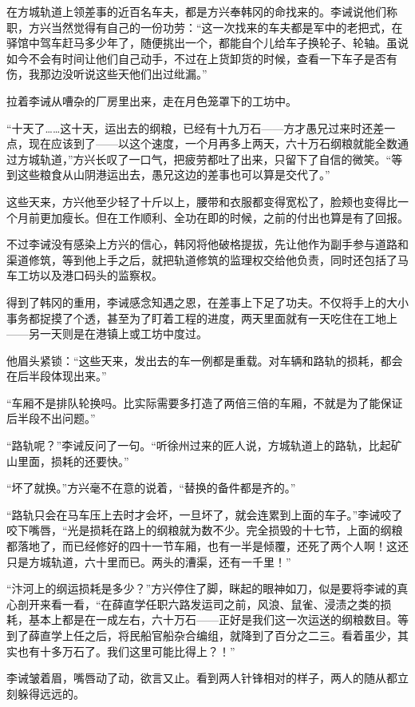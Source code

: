 在方城轨道上领差事的近百名车夫，都是方兴奉韩冈的命找来的。李诫说他们称职，方兴当然觉得有自己的一份功劳：“这一次找来的车夫都是军中的老把式，在驿馆中驾车赶马多少年了，随便挑出一个，都能自个儿给车子换轮子、轮轴。虽说如今不会有时间让他们自己动手，不过在上货卸货的时候，查看一下车子是否有伤，我那边没听说这些天他们出过纰漏。”

拉着李诫从嘈杂的厂房里出来，走在月色笼罩下的工坊中。

“十天了……这十天，运出去的纲粮，已经有十九万石——方才愚兄过来时还差一点，现在应该到了——以这个速度，一个月再多上两天，六十万石纲粮就能全数通过方城轨道，”方兴长叹了一口气，把疲劳都吐了出来，只留下了自信的微笑。“等到这些粮食从山阴港运出去，愚兄这边的差事也可以算是交代了。”

这些天来，方兴他至少轻了十斤以上，腰带和衣服都变得宽松了，脸颊也变得比一个月前更加瘦长。但在工作顺利、全功在即的时候，之前的付出也算是有了回报。

不过李诫没有感染上方兴的信心，韩冈将他破格提拔，先让他作为副手参与道路和渠道修筑，等到他上手之后，就把轨道修筑的监理权交给他负责，同时还包括了马车工坊以及港口码头的监察权。

得到了韩冈的重用，李诫感念知遇之恩，在差事上下足了功夫。不仅将手上的大小事务都捉摸了个透，甚至为了盯着工程的进度，两天里面就有一天吃住在工地上——另一天则是在港镇上或工坊中度过。

他眉头紧锁：“这些天来，发出去的车一例都是重载。对车辆和路轨的损耗，都会在后半段体现出来。”

“车厢不是排队轮换吗。比实际需要多打造了两倍三倍的车厢，不就是为了能保证后半段不出问题。”

“路轨呢？”李诫反问了一句。“听徐州过来的匠人说，方城轨道上的路轨，比起矿山里面，损耗的还要快。”

“坏了就换。”方兴毫不在意的说着，“替换的备件都是齐的。”

“路轨只会在马车压上去时才会坏，一旦坏了，就会连累到上面的车子。”李诫咬了咬下嘴唇，“光是损耗在路上的纲粮就为数不少。完全损毁的十七节，上面的纲粮都落地了，而已经修好的四十一节车厢，也有一半是倾覆，还死了两个人啊！这还只是方城轨道，六十里而已。两头的漕渠，还有一千里！”

“汴河上的纲运损耗是多少？”方兴停住了脚，眯起的眼神如刀，似是要将李诫的真心剖开来看一看，“在薛直学任职六路发运司之前，风浪、鼠雀、浸渍之类的损耗，基本上都是在一成左右，六十万石——正好是我们这一次运送的纲粮数目。等到了薛直学上任之后，将民船官船杂合编组，就降到了百分之二三。看着虽少，其实也有十多万石了。我们这里可能比得上？！”

李诫皱着眉，嘴唇动了动，欲言又止。看到两人针锋相对的样子，两人的随从都立刻躲得远远的。

